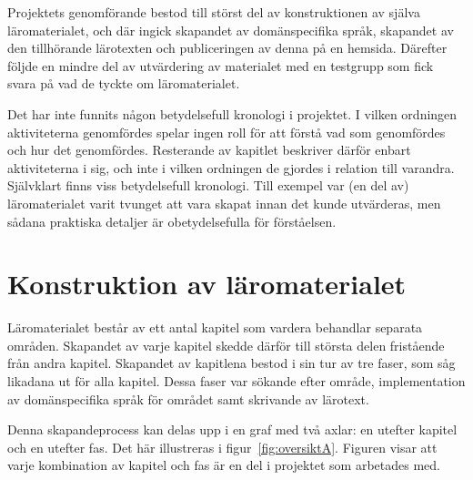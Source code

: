 \begin{draft}

Projektets genomförande bestod till störst del av konstruktionen av själva
läromaterialet, och där ingick skapandet av domänspecifika språk, skapandet av
den tillhörande lärotexten och publiceringen av denna på en hemsida. Därefter
följde en mindre del av utvärdering av materialet med en testgrupp som fick
svara på vad de tyckte om läromaterialet.

Det har inte funnits någon betydelsefull kronologi i projektet. I vilken ordningen aktiviteterna genomfördes spelar ingen roll för att förstå vad som genomfördes och hur det genomfördes. Resterande av kapitlet beskriver därför enbart aktiviteterna i sig, och inte i vilken ordningen de gjordes i relation till varandra. Självklart finns viss betydelsefull kronologi. Till exempel var (en del av) läromaterialet varit tvunget att vara skapat innan det kunde utvärderas, men sådana praktiska detaljer är obetydelsefulla för förståelsen.

\section{Konstruktion av läromaterialet}

Läromaterialet består av ett antal kapitel som vardera behandlar separata
områden. Skapandet av varje kapitel skedde därför till största delen fristående
från andra kapitel. Skapandet av kapitlena bestod i sin tur av tre faser,
som såg likadana ut för alla kapitel. Dessa faser var sökande efter område,
implementation av domänspecifika språk för området samt skrivande av lärotext.

Denna skapandeprocess kan delas upp i en graf med två axlar: en utefter kapitel och en
utefter fas. Det här illustreras i figur~\ref{fig:oversiktA}. Figuren visar att
varje kombination av kapitel och fas är en del i projektet som arbetades med.


\end{draft}
